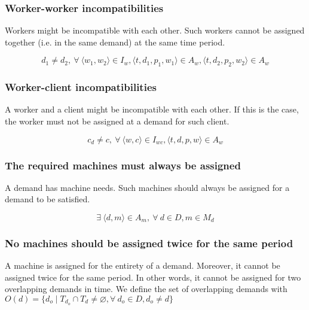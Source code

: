 \documentclass[../thesis.tex]{subfiles}
\begin{document}
\subsubsection{Worker-worker incompatibilities}

Workers might be incompatible with each other. Such workers cannot
be assigned together (i.e. in the same demand) at the same time period.

\begin{equation*}
  d_1 \neq d_2, \ \forall \ \langle w_1, w_2\rangle \in I_w, \langle t, d_1, p_1, w_1\rangle \in A_w,  \langle t, d_2, p_2, w_2\rangle \in A_w
\end{equation*}


\subsubsection{Worker-client incompatibilities}

A worker and a client might be incompatible with each other. 
If this is the case, the worker must not be assigned at a demand for such client.


\begin{equation*}
  c_d \neq c, \ \forall \ \langle w, c \rangle \in I_{wc}, \langle t, d, p, w\rangle \in A_w
\end{equation*}


\subsubsection{The required machines must always be assigned}

A demand has machine needs. Such machines should always be assigned 
for a demand to be satisfied.

\begin{equation*}
  \exists \ \langle d, m \rangle \in A_m, \ \forall \ d \in D, m \in M_d
\end{equation*}

\subsubsection{No machines should be assigned twice for the same period}

A machine is assigned for the entirety of a demand. Moreover, it cannot be assigned twice 
for the same period. In other words, it cannot be assigned for two overlapping demands in time.
We define the set of overlapping demands with $O(d) = \{ d_o \mid T_{d_o} \cap T_d \neq \varnothing, \forall \ d_o \in D, d_o \neq d \}$
\end{document}
